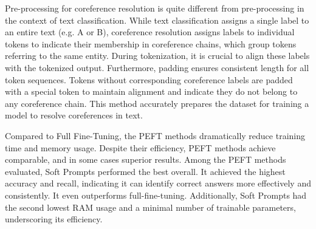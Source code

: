 Pre-processing for coreference resolution is quite different from pre-processing in the context of text classification. While text classification assigns a single label to an entire text (e.g. A or B), coreference resolution assigns labels to individual tokens to indicate their membership in coreference chains, which group tokens referring to the same entity. During tokenization, it is crucial to align these labels with the tokenized output. Furthermore, padding ensures consistent length for all token sequences. Tokens without corresponding coreference labels are padded with a special token to maintain alignment and indicate they do not belong to any coreference chain. This method accurately prepares the dataset for training a model to resolve coreferences in text.
\begin{table}[htbp]
    \centering
    \caption{Performance of Full Finetuning vs PEFT methods on CoNLL-2012 for mDeBERTa-base}
\end{table} Compared to Full Fine-Tuning, the PEFT methods dramatically reduce training time and memory usage. Despite their efficiency, PEFT methods achieve comparable, and in some cases superior results. Among the PEFT methods evaluated, Soft Prompts performed the best overall. It achieved the highest accuracy and recall, indicating it can identify correct answers more effectively and consistently. It even outperforms full-fine-tuning. Additionally, Soft Prompts had the second lowest RAM usage and a minimal number of trainable parameters, underscoring its efficiency. 

